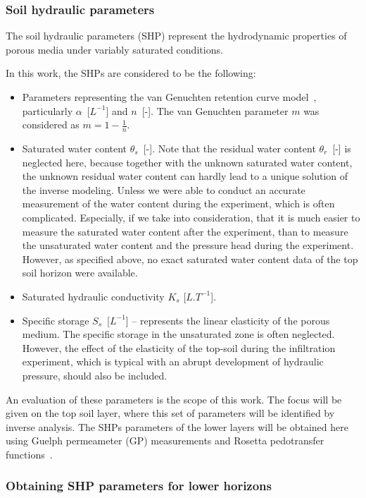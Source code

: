 \documentclass[review]{elsarticle}
\begin{document}
\subsubsection{Soil hydraulic parameters}
\label{shp}

The soil hydraulic parameters (SHP) represent the hydrodynamic properties of porous media under variably saturated conditions.

In this work, the SHPs are considered to be the following:

\begin{itemize}
\item Parameters representing the van Genuchten retention curve model~\citep{vangenuchten}, particularly $\alpha$~[$L^{-1}$]  and $n$~[-]. The van Genuchten parameter $m$ was considered as $m=1-\frac{1}{n}$. 
\item Saturated water content $\theta_s$~[-]. Note that the residual water content $\theta_r$~[-] is neglected here, because together with the unknown saturated water content, the unknown residual water content can hardly lead to a unique solution of the inverse modeling. Unless we were able to conduct an accurate measurement of the water content during the experiment, which is often complicated. Especially, if we take into consideration, that it is much easier to measure the saturated water content after the experiment, than to measure the unsaturated water content and the pressure head during the experiment. However, as specified above, no exact saturated water content data of the top soil horizon were available.
\item Saturated hydraulic conductivity $K_s$ [$L.T^{-1}$]. 
\item Specific storage $S_s$~[$L^{-1}$] -- represents the linear elasticity of the porous medium. The specific storage in the unsaturated zone is often neglected. However, the effect of the elasticity of the top-soil during the infiltration experiment, which is typical with an abrupt development of hydraulic pressure, should also be included.
\end{itemize}

An evaluation of these parameters is the scope of this work. The focus will be given on the top soil layer, where this set of parameters will be identified  by  inverse analysis. The SHPs parameters of the lower layers will be obtained here using Guelph permeameter (GP) measurements and Rosetta pedotransfer functions~\citep{Schaap}.


\subsubsection{Obtaining SHP parameters for lower horizons}
\label{dolni}
\end{document}
